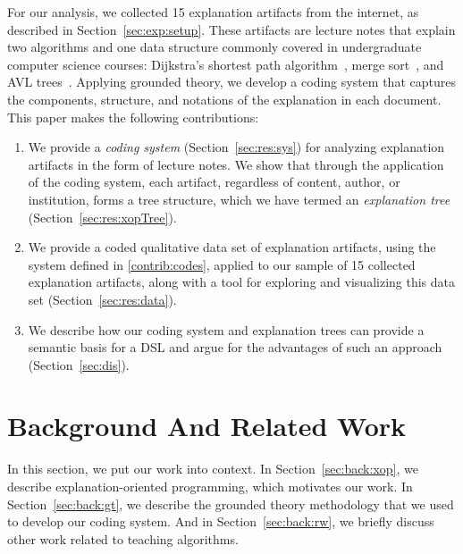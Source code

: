 \documentclass[sigconf]{acmart}
\begin{document}
For our analysis, we collected 15 explanation artifacts from the internet, as
described in Section~\ref{sec:exp:setup}. These artifacts are lecture notes
that explain two algorithms and one data structure commonly covered in
undergraduate computer science courses: Dijkstra's shortest path
algorithm~\cite[pp.~137--142]{KT06}, merge sort~\cite[pp.~210--214]{KT06}, and AVL
trees~\cite[pp.~458--475]{KnuthArt3}.
%
Applying grounded theory, we develop a coding system that
captures the components, structure, and notations of the explanation in each
document. This paper makes the following contributions:
%
\begin{enumerate}[label=C\arabic*.,ref=C\arabic*,leftmargin=*]


\item \label{contrib:codes}
%
We provide a \emph{coding system} (Section~\ref{sec:res:sys}) for analyzing
explanation artifacts in the form of lecture notes. We show that through the
application of the coding system, each artifact, regardless of content, author,
or institution, forms a tree structure, which we have termed an
\emph{explanation tree} (Section~\ref{sec:res:xopTree}).

\item \label{contrib:data}
%
We provide a coded qualitative data set of explanation artifacts, using the
system defined in \ref{contrib:codes}, applied to our sample of 15 collected
explanation artifacts, along with a tool for exploring and visualizing this
data set (Section~\ref{sec:res:data}).

\item \label{contrib:DSL}
%
We describe how our coding system and explanation trees can provide a semantic
basis for a DSL and argue for the advantages of such an approach
(Section~\ref{sec:dis}).
%
\end{enumerate}

\noindent

\section{Background And Related Work}
\label{sec:back}

In this section, we put our work into context.
%
In Section~\ref{sec:back:xop}, we describe explanation-oriented programming,
which motivates our work.
%
In Section~\ref{sec:back:gt}, we describe the grounded theory methodology that
we used to develop our coding system.
%
And in Section~\ref{sec:back:rw}, we briefly discuss other work related to
teaching algorithms.
\end{document}
